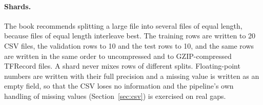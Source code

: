 \paragraph{Shards.} The book recommends splitting a large file into several files of equal length, because files of equal length interleave best. The training rows are written to 20 CSV files, the validation rows to 10 and the test rows to 10, and the same rows are written in the same order to uncompressed and to GZIP-compressed TFRecord files. A shard never mixes rows of different splits. Floating-point numbers are written with their full precision and a missing value is written as an empty field, so that the CSV loses no information and the pipeline's own handling of missing values (Section~\ref{sec:csv}) is exercised on real gaps.
